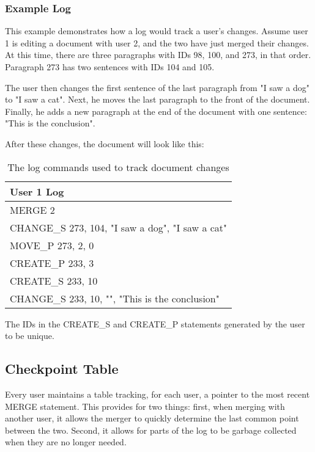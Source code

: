 \subsubsection{Example Log}
This example demonstrates how a log would track a user's changes. Assume user 1 is editing a document
with user 2, and the two have just merged their changes. At this time, there are three paragraphs with IDs 98, 100,
and  273, in that order. Paragraph 273 has two sentences with IDs 104 and 105. 

The user then changes the first sentence of the last paragraph from "I saw a dog" to "I saw a cat". Next, he moves the last
paragraph to the front of the document. Finally, he adds a new paragraph at the end of the document with one sentence:
"This is the conclusion".

After these changes, the document will look like this:

\begin{table}[h!]
\begin{center}
 \begin{tabular} {|l|}
  \hline
   User 1 Log \\
  \hline \hline
   MERGE 2 \\
   CHANGE\_S 273, 104, "I saw a dog", "I saw a cat" \\
   MOVE\_P 273, 2, 0 \\
   CREATE\_P 233, 3 \\
   CREATE\_S 233, 10 \\
   CHANGE\_S 233, 10, "", "This is the conclusion" \\
  \hline
 \end{tabular}
\end{center}
\caption{The log commands used to track document changes}
\label{table:log_commands}
\end{table}

The IDs in the CREATE\_S and CREATE\_P statements generated by the user to be unique.

\subsection{Checkpoint Table}

Every user maintains a table tracking, for each user, a pointer to the most recent MERGE statement.
This provides for two things: first, when merging with another user, it allows the merger
to quickly determine the last common point between the two. Second, it allows for parts
of the log to be garbage collected when they are no longer needed.

